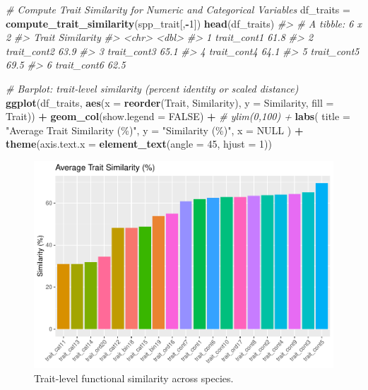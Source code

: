\documentclass[
]{article}
\newenvironment{Shaded}{\begin{snugshade}}{\end{snugshade}}
\newcommand{\AttributeTok}[1]{\textcolor[rgb]{0.13,0.29,0.53}{#1}}
\newcommand{\CommentTok}[1]{\textcolor[rgb]{0.56,0.35,0.01}{\textit{#1}}}
\newcommand{\ConstantTok}[1]{\textcolor[rgb]{0.56,0.35,0.01}{#1}}
\newcommand{\DecValTok}[1]{\textcolor[rgb]{0.00,0.00,0.81}{#1}}
\newcommand{\FunctionTok}[1]{\textcolor[rgb]{0.13,0.29,0.53}{\textbf{#1}}}
\newcommand{\NormalTok}[1]{#1}
\newcommand{\OtherTok}[1]{\textcolor[rgb]{0.56,0.35,0.01}{#1}}
\newcommand{\SpecialCharTok}[1]{\textcolor[rgb]{0.81,0.36,0.00}{\textbf{#1}}}
\newcommand{\StringTok}[1]{\textcolor[rgb]{0.31,0.60,0.02}{#1}}
\begin{document}
\begin{Shaded}
\begin{Highlighting}[]
\CommentTok{\# Compute Trait Similarity for Numeric and Categorical Variables}
\NormalTok{df\_traits }\OtherTok{=} \FunctionTok{compute\_trait\_similarity}\NormalTok{(spp\_trait[,}\SpecialCharTok{{-}}\DecValTok{1}\NormalTok{])}
\FunctionTok{head}\NormalTok{(df\_traits)}
\CommentTok{\#\textgreater{} \# A tibble: 6 x 2}
\CommentTok{\#\textgreater{}   Trait       Similarity}
\CommentTok{\#\textgreater{}   \textless{}chr\textgreater{}            \textless{}dbl\textgreater{}}
\CommentTok{\#\textgreater{} 1 trait\_cont1       61.8}
\CommentTok{\#\textgreater{} 2 trait\_cont2       63.9}
\CommentTok{\#\textgreater{} 3 trait\_cont3       65.1}
\CommentTok{\#\textgreater{} 4 trait\_cont4       64.1}
\CommentTok{\#\textgreater{} 5 trait\_cont5       69.5}
\CommentTok{\#\textgreater{} 6 trait\_cont6       62.5}

\CommentTok{\# Barplot: trait{-}level similarity (percent identity or scaled distance)}
\FunctionTok{ggplot}\NormalTok{(df\_traits, }\FunctionTok{aes}\NormalTok{(}\AttributeTok{x =} \FunctionTok{reorder}\NormalTok{(Trait, Similarity), }\AttributeTok{y =}\NormalTok{ Similarity, }\AttributeTok{fill =}\NormalTok{ Trait)) }\SpecialCharTok{+}
  \FunctionTok{geom\_col}\NormalTok{(}\AttributeTok{show.legend =} \ConstantTok{FALSE}\NormalTok{) }\SpecialCharTok{+}
  \CommentTok{\# ylim(0,100) +}
  \FunctionTok{labs}\NormalTok{(}
    \AttributeTok{title =} \StringTok{"Average Trait Similarity (\%)"}\NormalTok{,}
    \AttributeTok{y =} \StringTok{"Similarity (\%)"}\NormalTok{,}
    \AttributeTok{x =} \ConstantTok{NULL}
\NormalTok{  ) }\SpecialCharTok{+}
  \FunctionTok{theme}\NormalTok{(}\AttributeTok{axis.text.x =} \FunctionTok{element\_text}\NormalTok{(}\AttributeTok{angle =} \DecValTok{45}\NormalTok{, }\AttributeTok{hjust =} \DecValTok{1}\NormalTok{))}
\end{Highlighting}
\end{Shaded}

\begin{figure}
\includegraphics[width=1\linewidth]{man/figures/README-trait-sim-barplot-1} \caption{Trait-level functional similarity across species.}\label{fig:trait-sim-barplot}
\end{figure}
\end{document}
